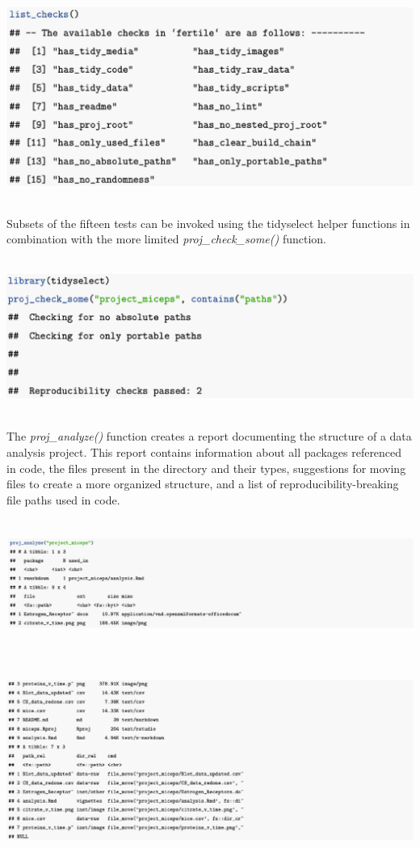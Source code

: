 \documentclass[APA,LATO1COL]{WileyNJD-v2}
\begin{document}
\vskip 0.25in

\centerline{\includegraphics[height=16pc,width=180mm]{fig-4}}

\vskip 0.25in

Subsets of the fifteen tests can be invoked using the tidyselect helper functions in combination with the more limited \textit{proj\_check\_some()} function.

\vskip 0.25in

\centerline{\includegraphics[height=12pc,width=180mm]{fig-5}}

\vskip 0.25in


The \textit{proj\_analyze()} function creates a report documenting the structure of a data analysis project. This report contains information about all packages referenced in code, the files present in the directory and their types, suggestions for moving files to create a more organized structure, and a list of reproducibility-breaking file paths used in code.

\vskip 0.25in

\centerline{\includegraphics[height=10pc,width=180mm]{fig-6}}
\centerline{\includegraphics[height=15pc,width=180mm]{fig-7}}
\end{document}
